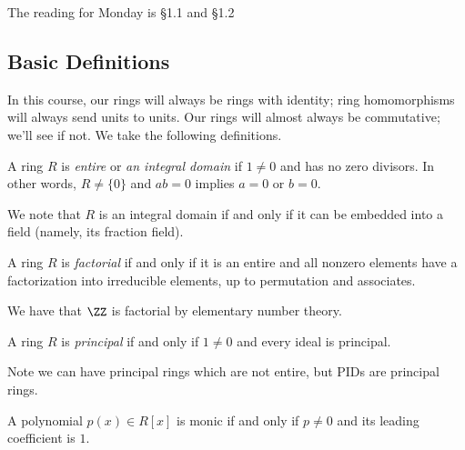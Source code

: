 \documentclass[../notes.tex]{subfiles}
\begin{document}
The reading for Monday is \S1.1 and \S1.2

\subsection{Basic Definitions}
In this course, our rings will always be rings with identity; ring homomorphisms will always send units to units. Our rings will almost always be commutative; we'll see if not. We take the following definitions.
\begin{defi}
    A ring $R$ is \textit{entire} or \textit{an integral domain} if $1\ne0$ and has no zero divisors. In other words, $R\ne\{0\}$ and $ab=0$ implies $a=0$ or $b=0.$
\end{defi}
We note that $R$ is an integral domain if and only if it can be embedded into a field (namely, its fraction field).
\begin{defi}
    A ring $R$ is \textit{factorial} if and only if it is an entire and all nonzero elements have a factorization into irreducible elements, up to permutation and associates.
\end{defi}
\begin{ex}
    We have that $\ZZ$ is factorial by elementary number theory.
\end{ex}
\begin{defi}[Principal]
    A ring $R$ is \textit{principal} if and only if $1\ne0$ and every ideal is principal.
\end{defi}
Note we can have principal rings which are not entire, but PIDs are principal rings.
\begin{defi}
    A polynomial $p(x)\in R[x]$ is monic if and only if $p\ne0$ and its leading coefficient is $1.$
\end{defi}
\end{document}
